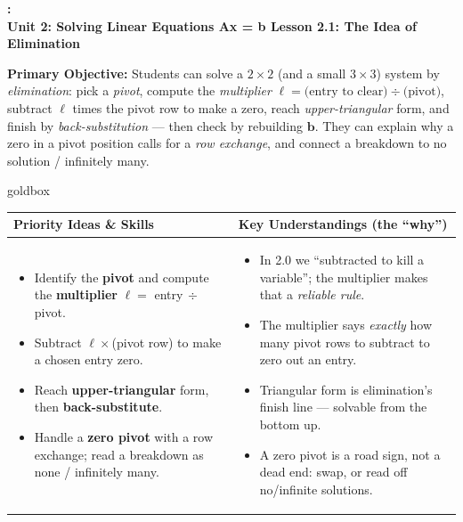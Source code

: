 \documentclass[10pt]{article}
\newcommand{\bb}{\mathbf{b}}
\newcommand{\UnitNumberName}{Unit 2: Solving Linear Equations Ax = b \quad}
\newcommand{\LessonNumberName}{Lesson 2.1: The Idea of Elimination}
\begin{document}
\begin{center}
    {\Large\bfseries \CourseName: \SchoolYear \\
    {\small\bfseries \UnitNumberName \LessonNumberName}}
\end{center}

\begin{tcolorbox}[colback=blush, colframe=burgundy, boxrule=0.9pt, arc=2mm,
    left=2mm, right=2mm, top=1.5mm, bottom=1.5mm]
    \textbf{Primary Objective:} Students can solve a $2\times 2$ (and a small $3\times 3$) system
    by \emph{elimination}: pick a \emph{pivot}, compute the \emph{multiplier} $\ell = \text{(entry
    to clear)}\div\text{(pivot)}$, subtract $\ell$ times the pivot row to make a zero, reach
    \emph{upper-triangular} form, and finish by \emph{back-substitution} --- then check by
    rebuilding $\bb$. They can explain why a zero in a pivot position calls for a \emph{row
    exchange}, and connect a breakdown to no solution / infinitely many.
\end{tcolorbox}

\renewcommand{\arraystretch}{1.4}
\begin{skillbox}{goldbox}
\begin{tabularx}{\linewidth}{@{}X|X@{}}
\textbf{Priority Ideas \& Skills} & \textbf{Key Understandings (the ``why'')} \\[2pt]
\hline
\vspace{-6pt}
\begin{itemize}[leftmargin=1.1em, nosep, after=\vspace{2pt}]
  \item Identify the \textbf{pivot} and compute the \textbf{multiplier} $\ell=$ entry$\,\div\,$pivot.
  \item Subtract $\ell\times$(pivot row) to make a chosen entry zero.
  \item Reach \textbf{upper-triangular} form, then \textbf{back-substitute}.
  \item Handle a \textbf{zero pivot} with a row exchange; read a breakdown as none / infinitely many.
\end{itemize}
&
\vspace{-6pt}
\begin{itemize}[leftmargin=1.1em, nosep, after=\vspace{2pt}]
  \item In 2.0 we ``subtracted to kill a variable''; the multiplier makes that a \emph{reliable rule}.
  \item The multiplier says \emph{exactly} how many pivot rows to subtract to zero out an entry.
  \item Triangular form is elimination's finish line --- solvable from the bottom up.
  \item A zero pivot is a road sign, not a dead end: swap, or read off no/infinite solutions.
\end{itemize}
\end{tabularx}
\end{skillbox}
\end{document}
